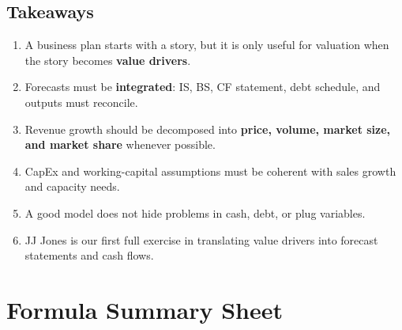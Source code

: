 \subsection{Takeaways}
\begin{enumerate}
  \item A business plan starts with a story, but it is only useful for valuation when the story becomes \textbf{value drivers}.
  \item Forecasts must be \textbf{integrated}: IS, BS, CF statement, debt schedule, and outputs must reconcile.
  \item Revenue growth should be decomposed into \textbf{price, volume, market size, and market share} whenever possible.
  \item CapEx and working-capital assumptions must be coherent with sales growth and capacity needs.
  \item A good model does not hide problems in cash, debt, or plug variables.
  \item JJ Jones is our first full exercise in translating value drivers into forecast statements and cash flows.
\end{enumerate}

\section{Formula Summary Sheet}

